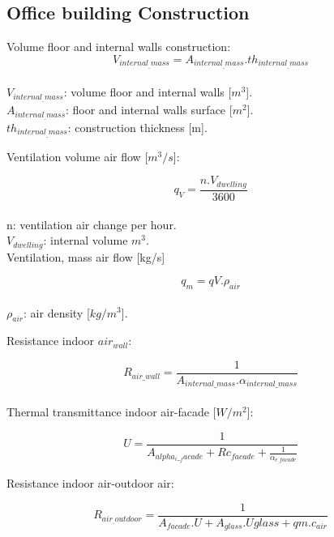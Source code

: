 \documentclass[a4paper,10pt]{article}
\begin{document}
\begin{appendices}
\section{Office building Construction}




Volume floor and internal walls construction:
\begin{equation}
V_{internal_{\_}mass}=A_{internal_{\_}mass}.th_{internal_{\_}mass}
\end{equation}
\\
$V_{internal_{\_}mass}$: volume floor and internal walls [$m^3$].\\
$A_{internal_{\_}mass}$: floor and internal walls surface [$m^2$].\\
$th_{internal_{\_}mass}$: construction thickness [m].

Ventilation volume air flow [$m^3/s$]:

\begin{equation}
q_{V}=\frac{n.V_{dwelling}}{3600}
\end{equation}
\\
n: ventilation air change per hour.\\  
$V_{dwelling}$: internal volume $m^3$.\\

Ventilation, mass air flow [kg/s]

\begin{equation}
q_{m}=q{V}.\rho_{air}
\end{equation}
\\
$\rho_{air}$: air density [$kg/m^3$].

Resistance indoor $air_{wall}$:

\begin{equation}
R_{air{\_}wall}=\frac{1}{A_{internal{\_}mass}.\alpha_{internal{\_}mass}}
\end{equation}
\\
Thermal transmittance indoor air-facade [$W/m^2$]: 

\begin{equation}
U=\frac{1}{A_{alpha_i{\_}_facade} + Rc_{facade} + \frac{1}{\alpha_{e_{\_}facade}}}
\end{equation}

Resistance indoor air-outdoor air:

\begin{equation}
R_{air_{\_}outdoor}=\frac{1}{A_{facade}.U + A_{glass}.U{glass}+q{m}.c_{air}}
\end{equation}


\end{appendices}
\end{document}

